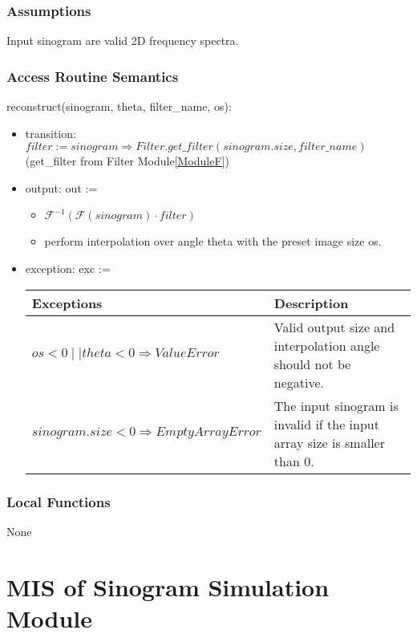 \documentclass[12pt, titlepage]{article}
\begin{document}
\subsubsection{Assumptions}
Input sinogram are valid 2D frequency spectra.

\subsubsection{Access Routine Semantics}

\noindent reconstruct(sinogram, theta, filter\_name, os):
\begin{itemize}
\item transition: \(filter := sinogram \Rightarrow Filter.get\_filter(sinogram.size,
  filter\_name)\) (get\_filter from Filter Module\ref{ModuleF})
\item output: out :=
  \begin{itemize}
    \item \(\mathcal{F}^{-1}(\mathcal{F}(sinogram)\cdot filter)\)
    \item perform interpolation over angle theta with the preset image size os.
  \end{itemize}
  \item exception: exc :=
    \begin{center}
      \begin{tabular}{|m{15em}|m{15em}|}
        \hline
        \textbf{Exceptions} & \textbf{Description} \\
        \hline
        \(os < 0 \mid\mid theta < 0 \Rightarrow ValueError\) & Valid output size and interpolation angle should not be negative. \\
        \hline
        \(sinogram.size < 0 \Rightarrow EmptyArrayError\) & The input sinogram is invalid if the input array size is smaller than 0.\\
        \hline
      \end{tabular}
    \end{center}
\end{itemize}


\subsubsection{Local Functions}
None

\newpage
\section{MIS of Sinogram Simulation Module} \label{ModuleS}
\end{document}
